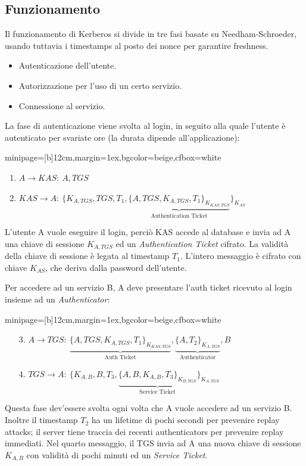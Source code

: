 \documentclass[a4paper, 11pt, twoside, openright, fleqn]{report}
\newcommand{\fromto}[2]{#1\rightarrow #2\!:\ }
\newenvironment{colbox}[2]%
{%
	\par\noindent\hspace{10pt}
	\begin{adjustbox}{minipage=[b]{#2},margin=1ex,bgcolor=#1,cfbox=white}
}{%
	\end{adjustbox}\newline%
}
\begin{document}
\subsection{Funzionamento}
Il funzionamento di Kerberos si divide in tre fasi basate su Needham-Schroeder, usando tuttavia i timestamps al posto dei nonce per garantire freshness.
\begin{itemize}
	\item Autenticazione dell'utente.
	\item Autorizzazione per l'uso di un certo servizio.
	\item Connessione al servizio.
\end{itemize}
La fase di autenticazione viene svolta al login, in seguito alla quale l'utente è autenticato per svariate ore (la durata dipende all'applicazione):
\begin{colbox}{beige}{12cm}
	\begin{enumerate}
		\item $\fromto{A}{KAS}A,TGS$
		\item $\fromto{KAS}{A}\{K_{A,T\!G\!S},TGS,T_1,
		\underbrace{\{A,TGS,K_{A,T\!G\!S},T_1\}_{K_{K\!A\!S,T\!G\!S}}}_{\mbox{Authentication Ticket}}\}_{K_{AS}}$
	\end{enumerate}
\end{colbox}
L'utente A vuole eseguire il login, perciò KAS accede al database e invia ad A una chiave di sessione $K_{A,TGS}$ ed un \emph{Authentication Ticket} cifrato.
La validità della chiave di sessione è legata al timestamp $T_1$. L'intero messaggio è cifrato con chiave $K_{AS}$, che deriva dalla password dell'utente.

Per accedere ad un servizio B, A deve presentare l'auth ticket ricevuto al login insieme ad un \emph{Authenticator}:
\begin{colbox}{beige}{12cm}
	\begin{enumerate}
		\item[3.] $\fromto{A}{TGS}\underbrace{\{A,TGS,K_{A,T\!G\!S},T_1\}_{K_{K\!A\!S,T\!G\!S}}}_{\mbox{Auth Ticket}}, \underbrace{\{A,T_2\}_{K_{A,T\!G\!S}}}_{\mbox{Authenticator}}, B$
		\item[4.] $\fromto{TGS}{A}\{K_{A,B},B,T_3,\underbrace{\{A,B,K_{A,B},T_3\}_{K_{B,T\!G\!S}}}_{\mbox{Service Ticket}}\}_{K_{A,T\!G\!S}}$
	\end{enumerate}
\end{colbox}
Questa fase dev'essere svolta ogni volta che A vuole accedere ad un servizio B. Inoltre il timestamp $T_2$ ha un lifetime di pochi secondi per prevenire replay attacks; il server tiene traccia dei recenti authenticators per prevenire replay immediati. Nel quarto messaggio, il TGS invia ad A una nuova chiave di sessione $K_{A,B}$ con validità di pochi minuti ed un \emph{Service Ticket}.
\end{document}
